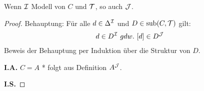 \begin{theorem} 
    \label{thm:filtration}
Wenn $\mathcal{I}$ Modell von $C$ und $\mathcal{T}$, so auch $\mathcal{J}$.
\end{theorem}

\begin{tafel}\mbox{}
\begin{proof}
    Behauptung:
Für alle $d \in \Delta^{\mathcal{I}}$ und $D \in \operatorname{sub}(C,\mathcal{T})$ gilt:
\begin{align*}
d \in D^\MI\ gdw.\ \left\lbrack d \right\rbrack \in D^{\MJ}
\end{align*}
Beweis der Behauptung per Induktion über die Struktur von $D$.

\textbf{I.A.} $C = A$ * folgt aus Definition $A^{\mathcal{J}}$.

\textbf{I.S.}


\end{proof}
\end{tafel}
